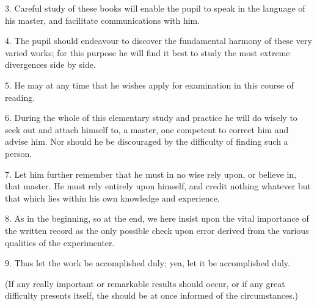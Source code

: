 3. Careful study of these books will enable the pupil to speak in the language of his master, and facilitate communications with him.

4. The pupil should endeavour to discover the fundamental harmony of these very varied works; for this purpose he will find it best to study the most extreme divergences side by side.

5. He may at any time that he wishes apply for examination in this course of reading.

6. During the whole of this elementary study and practice he will do wisely to seek out and attach himself to, a master, one competent to correct him and advise him. Nor should he be discouraged by the difficulty of finding such a person.

7. Let him further remember that he must in no wise rely upon, or believe in, that master. He must rely entirely upon himself, and credit nothing whatever but that which lies within his own knowledge and experience.

8. As in the beginning, so at the end, we here insist upon the vital importance of the written record as the only possible check upon error derived from the various qualities of the experimenter.

9. Thus let the work be accomplished duly; yea, let it be accomplished duly.

(If any really important or remarkable results should occur, or if any great difficulty presents itself, the \Argentium{} should be at once informed of the circumstances.)

